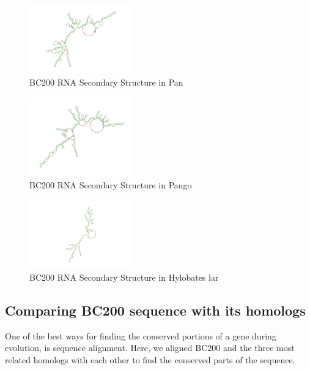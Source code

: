 \documentclass[conference]{IEEEtran}
\begin{document}
\begin{figure}[h]
  \centering
  \includegraphics[width=0.4\textwidth]{figs/rnapan.png}
  \caption{BC200 RNA Secondary Structure in Pan}
  \label{fig:pan-structure}
\end{figure}

\begin{figure}[h]
  \centering
  \includegraphics[width=0.4\textwidth]{figs/rnapango.png}
  \caption{BC200 RNA Secondary Structure in Pango}
  \label{fig:pango-structure}
\end{figure}

\begin{figure}[h]
  \centering
  \includegraphics[width=0.4\textwidth]{figs/rna.png}
  \caption{BC200 RNA Secondary Structure in Hylobates lar}
  \label{fig:hylobates-structure}
\end{figure}

\subsection{Comparing BC200 sequence with its homologs}

One of the best ways for finding the conserved portions of a gene during evolution, is sequence alignment. 
Here, we aligned BC200 and the three most related homologs with each other to find the conserved parts of the sequence.
\end{document}
